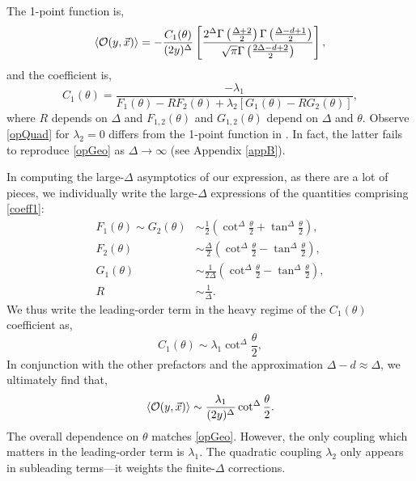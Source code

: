 \documentclass[reprint,amsmath,amssymb,aps,nofootinbib,twocolumn]{revtex4-2}
\newcommand{\jani}[1]{\textcolor{blue}{\textbf{??JK:} #1}}
\begin{document}
The 1-point function is,
\begin{equation}
\expval{\mathcal{O}(y,\vec{x})} = -\frac{C_{1}(\theta)}{(2y)^\Delta}\left[\frac{2^\Delta \Gamma\left(\frac{\Delta+2}{2}\right)\Gamma\left(\frac{\Delta-d+1}{2}\right)}{\sqrt{\pi}\Gamma\left(\frac{2\Delta - d+2}{2}\right)}\right],\label{opQuad}
\end{equation}
and the coefficient is,
\begin{equation}
C_{1}(\theta)
= \frac{-\lambda_1}{F_1(\theta) - RF_2(\theta) + \lambda_2 [G_1(\theta) - RG_2(\theta)]},\label{coeff1}
\end{equation}
where $R$ depends on $\Delta$ and $F_{1,2}(\theta)$ and $G_{1,2}(\theta)$ depend on $\Delta$ and $\theta$. Observe \eqref{opQuad} for $\lambda_2 = 0$ differs from the 1-point function in \cite{Fujita:2011fp}. In fact, the latter fails to reproduce \eqref{opGeo} as $\Delta \to \infty$ (see Appendix \ref{appB}).

In computing the large-$\Delta$ asymptotics of our expression, as there are a lot of pieces, we individually write the large-$\Delta$ expressions of the quantities comprising \eqref{coeff1}:
\begin{align}
F_1(\theta) \sim G_2(\theta) &\sim \frac{1}{2}\left(\cot^\Delta \frac{\theta}{2} + \tan^\Delta \frac{\theta}{2}\right),\\
F_2(\theta) &\sim \frac{\Delta}{2}\left(\cot^\Delta \frac{\theta}{2} - \tan^\Delta\frac{\theta}{2}\right),\\
G_1(\theta) &\sim \frac{1}{2\Delta}\left(\cot^\Delta\frac{\theta}{2} - \tan^\Delta\frac{\theta}{2}\right),\\
R &\sim \frac{1}{\Delta}.
\end{align}
We thus write the leading-order term in the heavy regime of the $C_1(\theta)$ coefficient as,
\begin{equation}
C_{1}(\theta) \sim \lambda_1 \cot^\Delta\frac{\theta}{2},
\end{equation}
In conjunction with the other prefactors and the approximation $\Delta - d \approx \Delta$, we ultimately find that,
\begin{equation}
\expval{\mathcal{O}(y,\vec{x})} \sim \frac{\lambda_1}{(2y)^\Delta}\cot^\Delta\frac{\theta}{2}.\label{opAsympt}
\end{equation}
The overall dependence on $\theta$ matches \eqref{opGeo}. However, the only coupling which matters in the leading-order term is $\lambda_1$. The quadratic coupling $\lambda_2$ only appears in subleading terms---it weights the finite-$\Delta$ corrections. %
\end{document}
